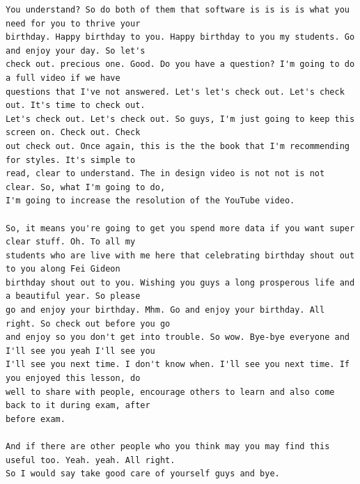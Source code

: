 {\begin{Verbatim}
You understand? So do both of them that software is is is is what you need for you to thrive your
birthday. Happy birthday to you. Happy birthday to you my students. Go and enjoy your day. So let's
check out. precious one. Good. Do you have a question? I'm going to do a full video if we have
questions that I've not answered. Let's let's check out. Let's check out. It's time to check out.
Let's check out. Let's check out. So guys, I'm just going to keep this screen on. Check out. Check
out check out. Once again, this is the the book that I'm recommending for styles. It's simple to
read, clear to understand. The in design video is not not is not clear. So, what I'm going to do,
I'm going to increase the resolution of the YouTube video.

So, it means you're going to get you spend more data if you want super clear stuff. Oh. To all my
students who are live with me here that celebrating birthday shout out to you along Fei Gideon
birthday shout out to you. Wishing you guys a long prosperous life and a beautiful year. So please
go and enjoy your birthday. Mhm. Go and enjoy your birthday. All right. So check out before you go
and enjoy so you don't get into trouble. So wow. Bye-bye everyone and I'll see you yeah I'll see you
I'll see you next time. I don't know when. I'll see you next time. If you enjoyed this lesson, do
well to share with people, encourage others to learn and also come back to it during exam, after
before exam.

And if there are other people who you think may you may find this useful too. Yeah. yeah. All right.
So I would say take good care of yourself guys and bye.
\end{Verbatim}
}
